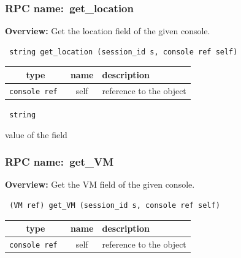 \subsubsection{RPC name:~get\_location}

{\bf Overview:} 
Get the location field of the given console.

\begin{verbatim} string get_location (session_id s, console ref self)\end{verbatim}



 
\vspace{0.3cm}
\begin{tabular}{|c|c|p{7cm}|}
 \hline
{\bf type} & {\bf name} & {\bf description} \\ \hline
{\tt console ref } & self & reference to the object \\ \hline 

\end{tabular}

\vspace{0.3cm}

{\tt 
string
}


value of the field
\vspace{0.3cm}
\vspace{0.3cm}
\vspace{0.3cm}
\subsubsection{RPC name:~get\_VM}

{\bf Overview:} 
Get the VM field of the given console.

\begin{verbatim} (VM ref) get_VM (session_id s, console ref self)\end{verbatim}



 
\vspace{0.3cm}
\begin{tabular}{|c|c|p{7cm}|}
 \hline
{\bf type} & {\bf name} & {\bf description} \\ \hline
{\tt console ref } & self & reference to the object \\ \hline 

\end{tabular}

\vspace{0.3cm}

